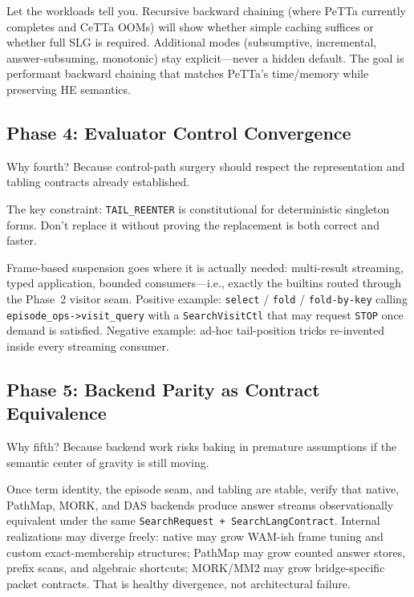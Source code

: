 \documentclass[11pt]{article}
\newcommand{\code}[1]{\texttt{#1}}
\newcommand{\CeTTa}{\textup{CeTTa}}
\newcommand{\HE}{\textup{HE}}
\newcommand{\PeTTa}{\textup{PeTTa}}
\newcommand{\PathMap}{\textup{PathMap}}
\newcommand{\MORK}{\textup{MORK}}
\begin{document}
Let the workloads tell you.  Recursive backward chaining (where
\PeTTa{} currently completes and \CeTTa{} OOMs) will show whether
simple caching suffices or whether full SLG is required.  Additional
modes (subsumptive, incremental, answer-subsuming, monotonic) stay
explicit---never a hidden default.  The goal is performant backward
chaining that matches \PeTTa{}'s time/memory while preserving \HE{}
semantics.

\subsection{Phase 4: Evaluator Control Convergence}

Why fourth?  Because control-path surgery should respect the
representation and tabling contracts already established.

The key constraint: \code{TAIL\_REENTER} is constitutional for deterministic
singleton forms.  Don't replace it without proving the replacement is
both correct and faster.

Frame-based suspension goes where it is actually needed: multi-result
streaming, typed application, bounded consumers---i.e., exactly the
builtins routed through the Phase~2 visitor seam.  Positive example:
\code{select} / \code{fold} / \code{fold-by-key} calling
\code{episode\_ops->visit\_query} with a \code{SearchVisitCtl} that
may request \code{STOP} once demand is satisfied.  Negative example:
ad-hoc tail-position tricks re-invented inside every streaming
consumer.

\subsection{Phase 5: Backend Parity as Contract Equivalence}

Why fifth?  Because backend work risks baking in premature
assumptions if the semantic center of gravity is still moving.

Once term identity, the episode seam, and tabling are stable, verify
that native, \PathMap{}, \MORK{}, and DAS backends produce answer
streams observationally equivalent under the same
\code{SearchRequest + SearchLangContract}.  Internal realizations
may diverge freely: native may grow WAM-ish frame tuning and custom
exact-membership structures; \PathMap{} may grow counted answer
stores, prefix scans, and algebraic shortcuts; \MORK{}/MM2 may grow
bridge-specific packet contracts.  That is healthy divergence, not
architectural failure.
\end{document}

